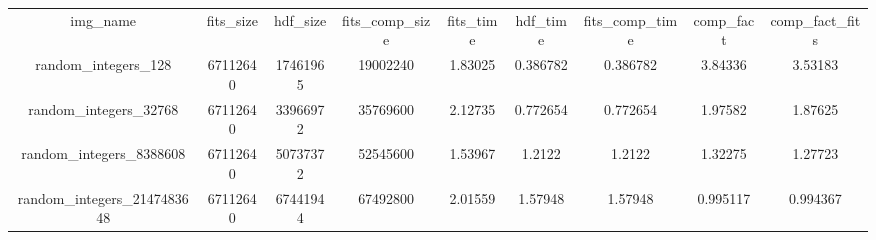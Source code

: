 \begin{table}
\begin{tabular}{ccccccccc}
img_name & fits_size & hdf_size & fits_comp_size & fits_time & hdf_time & fits_comp_time & comp_fact & comp_fact_fits \\
random_integers_128 & 67112640 & 17461965 & 19002240 & 1.83025 & 0.386782 & 0.386782 & 3.84336 & 3.53183 \\
random_integers_32768 & 67112640 & 33966972 & 35769600 & 2.12735 & 0.772654 & 0.772654 & 1.97582 & 1.87625 \\
random_integers_8388608 & 67112640 & 50737372 & 52545600 & 1.53967 & 1.2122 & 1.2122 & 1.32275 & 1.27723 \\
random_integers_2147483648 & 67112640 & 67441944 & 67492800 & 2.01559 & 1.57948 & 1.57948 & 0.995117 & 0.994367 \\
\end{tabular}
\end{table}
